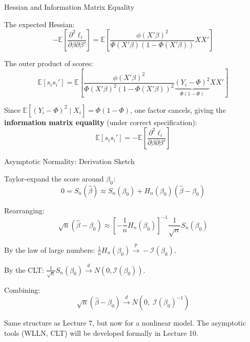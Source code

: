\documentclass[aspectratio=169, handout, t]{beamer}
\numberwithin{equation}{section}
\begin{document}

\begin{frame}{Hessian and Information Matrix Equality}

The expected Hessian:
\[
-\mathbb{E}\!\left[\frac{\partial^2 \ell_i}{\partial \beta \partial \beta'}\right]
=
\mathbb{E}\!\left[\frac{\phi(X'\beta)^2}{\Phi(X'\beta)(1-\Phi(X'\beta))} X X'\right]
\]

\pause

The outer product of scores:
\[
\mathbb{E}[s_i s_i']
=
\mathbb{E}\!\left[\frac{\phi(X'\beta)^2}{\Phi(X'\beta)^2(1-\Phi(X'\beta))^2} \underbrace{(Y_i - \Phi)^2}_{\Phi(1-\Phi)} X X'\right]
\]

\pause

Since $\mathbb{E}[(Y_i - \Phi)^2 \mid X_i] = \Phi(1-\Phi)$, one factor cancels, giving the \textbf{information matrix equality} (under correct specification):
\[
\boxed{\mathbb{E}[s_i s_i'] = -\mathbb{E}\!\left[\frac{\partial^2 \ell_i}{\partial \beta \partial \beta'}\right]}
\]

\end{frame}


\begin{frame}{Asymptotic Normality: Derivation Sketch}

Taylor-expand the score around $\beta_0$:
\[
0 = S_n(\hat\beta) \approx S_n(\beta_0) + H_n(\beta_0)(\hat\beta - \beta_0)
\]

\pause

Rearranging:
\[
\sqrt{n}(\hat\beta - \beta_0) \approx \left[-\frac{1}{n}H_n(\beta_0)\right]^{-1} \frac{1}{\sqrt{n}} S_n(\beta_0)
\]

\pause

By the law of large numbers: $\frac{1}{n}H_n(\beta_0) \overset{p}{\to} -\mathcal{I}(\beta_0)$.

\pause

By the CLT: $\frac{1}{\sqrt{n}} S_n(\beta_0) \overset{d}{\to} N(0, \mathcal{I}(\beta_0))$.

\pause

Combining:
\[
\boxed{\sqrt{n}(\hat\beta - \beta_0) \overset{d}{\to} N\!\left(0,\; \mathcal{I}(\beta_0)^{-1}\right)}
\]

\pause

Same structure as Lecture 7, but now for a nonlinear model. The asymptotic tools (WLLN, CLT) will be developed formally in Lecture 10.

\end{frame}
\end{document}
